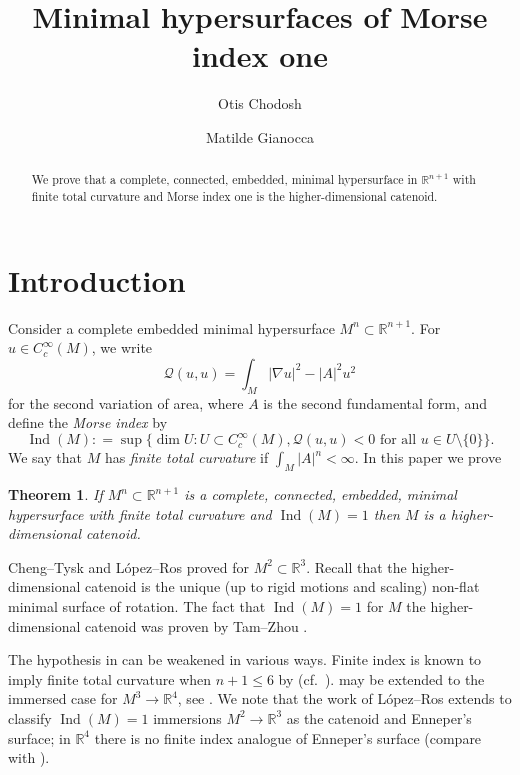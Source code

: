 \documentclass[11pt]{amsart}
\title{Minimal hypersurfaces of Morse index one}
\author[Otis Chodosh]{Otis Chodosh}
\author[Matilde Gianocca]{Matilde Gianocca}
\date{}
\numberwithin{equation}{section}
\theoremstyle{plain}
\newtheorem{theorem}{Theorem}[section]
\theoremstyle{definition}
\theoremstyle{remark}
\newcommand{\R}{\mathbb{R}}
\DeclareMathOperator{\Ind}{Ind}
\newcommand{\Qcal}{\mathcal Q}
\begin{document}


\begin{abstract}
We prove that a complete, connected, embedded, minimal hypersurface in $\R^{n+1}$ with finite total curvature and Morse index one is the higher-dimensional catenoid. 
\end{abstract}


\maketitle



\section{Introduction}

Consider a complete embedded minimal hypersurface $M^n\subset \R^{n+1}$. For $u \in C^\infty_c(M)$, we write
\begin{equation}\label{eq:Q}
\Qcal(u,u) = \int_M |\nabla u|^2 - |A|^2 u^2
\end{equation}
for the second variation of area, where $A$ is the second fundamental form, and define the \emph{Morse index} by
\begin{equation}\label{eq:index}
\Ind(M) : = \sup\{ \dim U : U \subset C^\infty_c(M) , \Qcal(u,u) < 0 \textrm{ for all }u \in U\setminus\{0\}\}. 
\end{equation}
We say that $M$ has \emph{finite total curvature} if $\int_M |A|^n < \infty$. In this paper we prove 
\begin{theorem}\label{thm:main}
If $M^n\subset \R^{n+1}$ is a complete, connected, embedded, minimal hypersurface with finite total curvature and $\Ind(M) = 1$ then $M$ is a higher-dimensional catenoid. 
\end{theorem}
Cheng--Tysk \cite{ChengTysk1988} and L\'opez--Ros \cite{LopezRos1989} proved  for $M^2\subset \R^3$. Recall that the higher-dimensional catenoid is the unique  (up to rigid motions and scaling) non-flat minimal surface of rotation. The fact that $\Ind(M) = 1$ for $M$ the higher-dimensional catenoid was proven by Tam--Zhou \cite{TamZhou2009}. 


The hypothesis in  can be weakened in various ways. Finite index is known to imply finite total curvature when $n+1 \leq 6$ by \cite{FC85,Tys89,CL21,CLMS24,Maz24} (cf.\ ).   may be extended to the immersed case for $M^3\to\R^4$, see . We note that the work of L\'opez--Ros extends to classify $\Ind(M)=1$ immersions $M^2\to\R^3$ as the catenoid and Enneper's surface; in $\R^4$ there is no finite index analogue of Enneper's surface (compare with \cite{Choe1996}).
\end{document}

